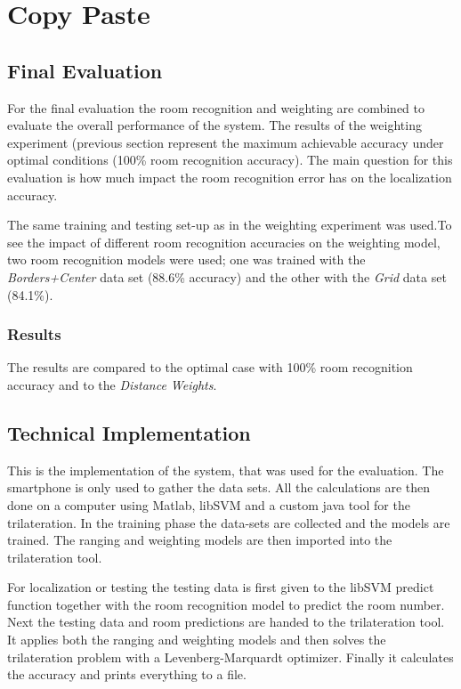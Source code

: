 \chapter{Copy Paste}

\section{Final Evaluation}

For the final evaluation the room recognition and weighting are combined to evaluate the overall performance of the system. The results of the weighting experiment (previous section  represent the maximum achievable accuracy under optimal conditions (100\% room recognition accuracy).  The main question for this evaluation is how much impact the room recognition error has on the localization accuracy.

The same training and testing set-up as in the weighting experiment was used.To see the impact of different room recognition accuracies on the weighting model, two room recognition models were used; one was trained with the \emph{Borders+Center} data set (88.6\% accuracy) and the other with the \emph{Grid} data set (84.1\%).

\subsection{Results}

The results are compared to the optimal case with 100\% room recognition accuracy and to the \emph{Distance Weights}.

\section{Technical Implementation}
\label{technicalImplementation}

This is the implementation of the system, that was used for the evaluation. The smartphone is only used to gather the data sets. All the calculations are then done on a computer using Matlab, libSVM and a custom java tool for the trilateration. In the training phase the data-sets are collected and the models are trained. The ranging and weighting models are then imported into the trilateration tool.

For localization or testing the testing data is first given to the libSVM predict function together with the room recognition model to predict the room number. Next the testing data and room predictions are handed to the trilateration tool. It applies both the ranging and weighting models and then solves the trilateration problem with a Levenberg-Marquardt optimizer. Finally it calculates the accuracy and prints everything to a file.

